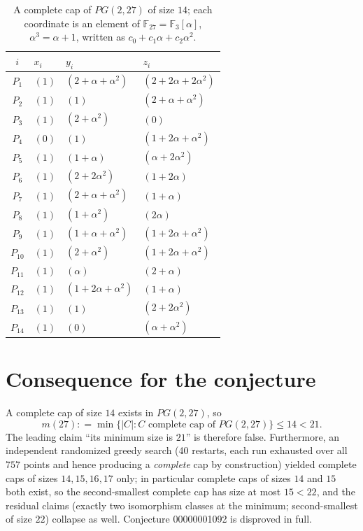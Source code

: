 \documentclass[11pt]{article}
\begin{document}
\begin{table}[h]
\centering
\begin{tabular}{clll}
\toprule
$i$ & $x_i$ & $y_i$ & $z_i$\\
\midrule
$P_1$ & $(1)$ & $(2+\alpha+\alpha^2)$ & $(2+2\alpha+2\alpha^2)$\\
$P_2$ & $(1)$ & $(1)$ & $(2+\alpha+\alpha^2)$\\
$P_3$ & $(1)$ & $(2+\alpha^2)$ & $(0)$\\
$P_4$ & $(0)$ & $(1)$ & $(1+2\alpha+\alpha^2)$\\
$P_5$ & $(1)$ & $(1+\alpha)$ & $(\alpha+2\alpha^2)$\\
$P_6$ & $(1)$ & $(2+2\alpha^2)$ & $(1+2\alpha)$\\
$P_7$ & $(1)$ & $(2+\alpha+\alpha^2)$ & $(1+\alpha)$\\
$P_8$ & $(1)$ & $(1+\alpha^2)$ & $(2\alpha)$\\
$P_9$ & $(1)$ & $(1+\alpha+\alpha^2)$ & $(1+2\alpha+\alpha^2)$\\
$P_{10}$ & $(1)$ & $(2+\alpha^2)$ & $(1+2\alpha+\alpha^2)$\\
$P_{11}$ & $(1)$ & $(\alpha)$ & $(2+\alpha)$\\
$P_{12}$ & $(1)$ & $(1+2\alpha+\alpha^2)$ & $(1+\alpha)$\\
$P_{13}$ & $(1)$ & $(1)$ & $(2+2\alpha^2)$\\
$P_{14}$ & $(1)$ & $(0)$ & $(\alpha+\alpha^2)$\\
\bottomrule
\end{tabular}
\caption{A complete cap of $PG(2,27)$ of size $14$; each coordinate is an element of $\mathbb{F}_{27}=\mathbb{F}_3[\alpha]$, $\alpha^3=\alpha+1$, written as $c_0+c_1\alpha+c_2\alpha^2$.}
\label{tab:cap}
\end{table}

\section{Consequence for the conjecture}

A complete cap of size $14$ exists in $PG(2,27)$, so
\[
m(27) \mathrel{\mathop:}= \min\{|C| : C \text{ complete cap of } PG(2,27)\} \le 14 < 21.
\]
The leading claim ``its minimum size is $21$'' is therefore false. Furthermore, an independent randomized greedy search (40 restarts, each run exhausted over all $757$ points and hence producing a \emph{complete} cap by construction) yielded complete caps of sizes $14,15,16,17$ only; in particular complete caps of sizes $14$ and $15$ both exist, so the second-smallest complete cap has size at most $15 < 22$, and the residual claims (exactly two isomorphism classes at the minimum; second-smallest of size $22$) collapse as well. Conjecture 00000001092 is disproved in full.
\end{document}
